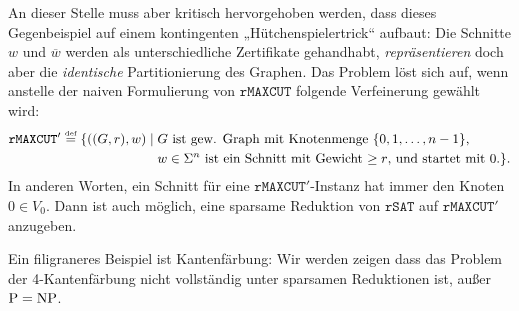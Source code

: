 An dieser Stelle muss aber kritisch hervorgehoben werden, dass dieses Gegenbeispiel auf einem kontingenten „Hütchenspielertrick“ aufbaut: Die Schnitte $w$ und $\overline{w}$ werden als unterschiedliche Zertifikate gehandhabt, \emph{repräsentieren} doch aber die \emph{identische} Partitionierung des Graphen.
Das Problem löst sich auf, wenn anstelle der naiven Formulierung von $\mathtt{rMAXCUT}$ folgende Verfeinerung gewählt wird:
\[ \begin{split} \mathtt{rMAXCUT'} \stackrel{\text{{\normalfont\tiny def}}}{=} \{ ((G, r), w) \mid {}&\text{$G$ ist gew. Graph mit Knotenmenge $\{0,1,\dots,n-1\}$,} \\ &\text{$w\in\Sigma^n$ ist ein Schnitt mit Gewicht $\geq r$, und startet mit $0$.} \}.\end{split} \]
In anderen Worten, ein Schnitt für eine $\mathtt{rMAXCUT'}$-Instanz hat immer den Knoten $0\in V_0$.
Dann ist auch möglich, eine sparsame Reduktion von $\mathtt{rSAT}$ auf $\mathtt{rMAXCUT'}$ anzugeben.

Ein filigraneres Beispiel ist Kantenfärbung:  Wir werden zeigen dass das Problem der 4-Kantenfärbung nicht vollständig unter sparsamen Reduktionen ist, außer $\mathrm{P}=\mathrm{NP}$.

